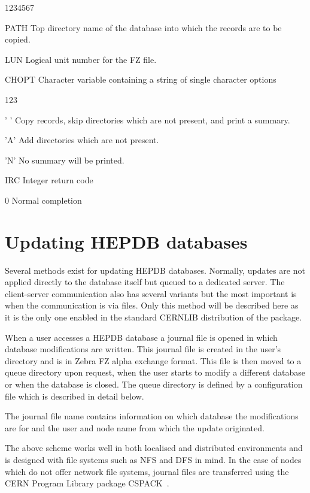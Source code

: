 \begin{DLtt}{1234567}
\item[PATH]Top directory name of the database into which the records
  are to be copied.
\item[LUN]Logical unit number for the FZ file.
\item[CHOPT]Character variable containing a string of single character options
  \begin{DLtt}{123}
    \item[' ']Copy records, skip directories which are not
      present, and print a summary.
    \item['A']Add directories which are not present.
    \item['N']No summary will be printed.
  \end{DLtt}
\item[IRC]Integer return code
  \begin{DLtt}{1}
    \item[0]Normal completion
  \end{DLtt}
\end{DLtt}

\chapter{Updating HEPDB databases}

Several methods exist for updating HEPDB databases. Normally,
updates are not applied directly to the database itself but
queued to a dedicated server. The client-server communication
also has several variants but the most important is when the
communication is via files.
Only this method will be described here as it is the only one
enabled in the standard CERNLIB distribution of the package.

When a user accesses a HEPDB database a journal file is opened
in which database modifications are written. This journal file
is created in the user's directory and is in Zebra FZ alpha exchange
format. This file is then moved to a queue directory upon request,
when the user starts to modify a different
database or when the database is closed. The queue directory is
defined by a configuration file which is described in detail below.

The journal file name contains information on which database
the modifications are for and the user and node name from which
the update originated.

The above scheme works well in both localised and distributed
environments and is designed with file systems such as NFS and
DFS in mind. In the case of nodes which do not offer network
file systems, journal files are transferred using the
CERN Program Library package CSPACK~\cite{bib-CSPACK}.

